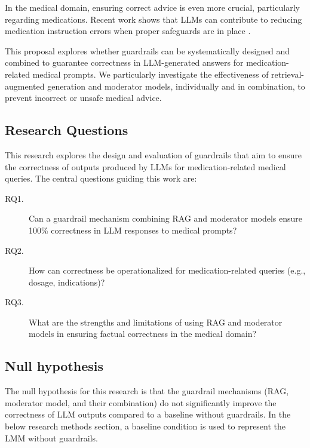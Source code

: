 In the medical domain, ensuring correct advice is even more crucial, particularly regarding medications.
Recent work shows that LLMs can contribute to reducing medication instruction errors when proper safeguards are in place \citep{pais2024medication}.

This proposal explores whether guardrails can be systematically designed and combined to guarantee correctness in LLM-generated answers for medication-related medical prompts.
We particularly investigate the effectiveness of retrieval-augmented generation and moderator models, individually and in combination, to prevent incorrect or unsafe medical advice.

\subsection{Research Questions}
This research explores the design and evaluation of guardrails that aim to ensure the correctness of outputs produced by LLMs for medication-related medical queries.
The central questions guiding this work are:

\begin{description}
    \item[RQ1.] Can a guardrail mechanism combining RAG and moderator models ensure 100\% correctness in LLM responses to medical prompts?
    \item[RQ2.] How can correctness be operationalized for medication-related queries (e.g., dosage, indications)?
    \item[RQ3.] What are the strengths and limitations of using RAG and moderator models in ensuring factual correctness in the medical domain?
\end{description}

\subsection{Null hypothesis}
The null hypothesis for this research is that the guardrail mechanisms (RAG, moderator model, and their combination)
do not significantly improve the correctness of LLM outputs compared to a baseline without guardrails.
In the below research methods section, a baseline condition is used to represent the LMM without guardrails.
